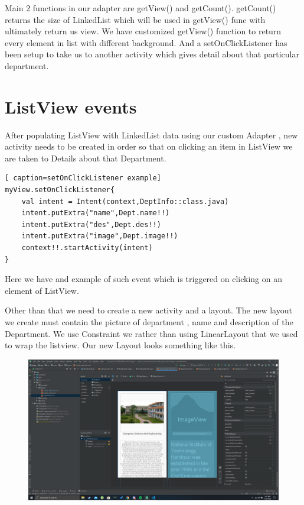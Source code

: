\documentclass[11pt,a4paper]{report}
\begin{document}
  \vspace{5pt}

Main 2 functions in our adapter are  getView() and getCount().
getCount() returns the size of LinkedList which will be used in getView() func 
with ultimately return us view.
We have customized getView() function to return every element in list with different
background.
And a setOnClickListener has been setup to take us to another activity which gives detail 
about that particular department.


\chapter{ListView events}

After populating ListView with LinkedList data using our custom Adapter , new activity needs
to be created in order so that on clicking an item in ListView we are taken to Details about
that Department.

\vspace{15pt}
\begin{lstlisting}[ caption=setOnClickListener example]
myView.setOnClickListener{
    val intent = Intent(context,DeptInfo::class.java)
    intent.putExtra("name",Dept.name!!)
    intent.putExtra("des",Dept.des!!)
    intent.putExtra("image",Dept.image!!)
    context!!.startActivity(intent)
}

\end{lstlisting}

Here we have and example of such event which is triggered on clicking on an element of ListView.

Other than that we need to create a new activity and a layout.
The new layout we create must contain the picture of department , name and description
of the Department.
We use Constraint we rather than using LinearLayout that we used to wrap the listview.
Our new Layout looks something like this.


\vspace{15pt}

\begin{figure}[H]
	\centering
		\includegraphics[scale=0.2]{./img/new_act.png}
  \end{figure}
\end{document}
